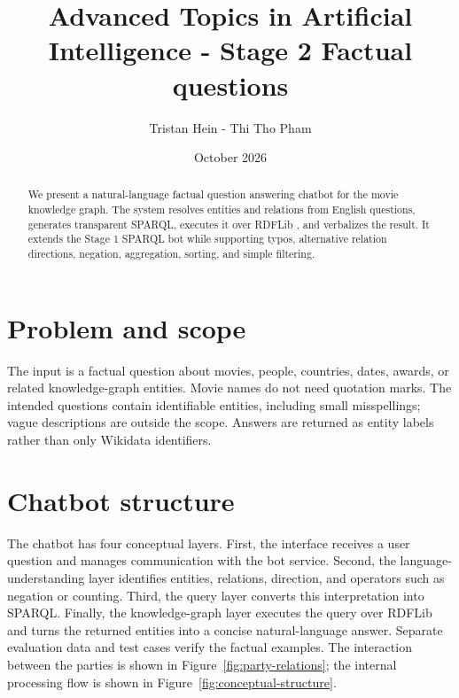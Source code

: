 \documentclass[10pt,a4paper]{article}
\title{\vspace{-1.5 em}\textbf{Advanced Topics in Artificial Intelligence - Stage 2 Factual questions}}
\author{\vspace{0 em} Tristan Hein - Thi Tho Pham}
\date{\vspace{-1 em} October 2026}
\begin{document}
\maketitle
\vspace{-3 em}

\begin{abstract}
We present a natural-language factual question answering chatbot for the movie knowledge graph. The system resolves entities and relations from English questions, generates transparent SPARQL, executes it over RDFLib , and verbalizes the result. It extends the Stage 1 SPARQL bot while supporting typos, alternative relation directions, negation, aggregation, sorting, and simple filtering.
\end{abstract}

\section{Problem and scope}
The input is a factual question about movies, people, countries, dates, awards, or related knowledge-graph entities. Movie names do not need quotation marks. The intended questions contain identifiable entities, including small misspellings; vague descriptions are outside the scope. Answers are returned as entity labels rather than only Wikidata identifiers.


\section{Chatbot structure}
The chatbot has four conceptual layers. First, the interface receives a user question and manages communication with the bot service. Second, the language-understanding layer identifies entities, relations, direction, and operators such as negation or counting. Third, the query layer converts this interpretation into SPARQL. Finally, the knowledge-graph layer executes the query over RDFLib and turns the returned entities into a concise natural-language answer. Separate evaluation data and test cases verify the factual examples. The interaction between the parties is shown in Figure~\ref{fig:party-relations}; the internal processing flow is shown in Figure~\ref{fig:conceptual-structure}.

\begin{center}
\end{center}
\end{document}
